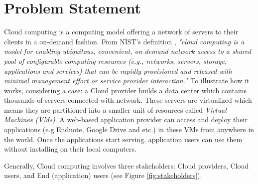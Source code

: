 \section{Problem Statement}

Cloud computing is a computing model offering a network of servers to their 
clients in a on-demand fashion. From NIST's definition \cite{Mell:2011jj}, \textit{"cloud computing is a model for enabling ubiquitous, convenient, on-demand network access to a shared pool of configurable computing resources (e.g., networks, servers, storage, applications and services) that can be rapidly provisioned and released with minimal management effort or service provider interaction."} 
To illustrate how it works, considering a case: a Cloud provider builds a data center which contains thousands of servers connected with network. These servers are virtualized which means they are partitioned into a smaller unit of resources called \emph{Virtual Machines (VMs)}. A web-based application provider can access and deploy their applications (e.g Endnote, Google Drive and etc.) in these VMs from anywhere in the world. Once the applications start serving, application users can use them without installing on their local computers.

Generally, Cloud computing involves three stakeholders: Cloud providers, Cloud users, and End (application) users \cite{Jennings:2015ht} (see Figure \ref{fig:stakeholders}).

